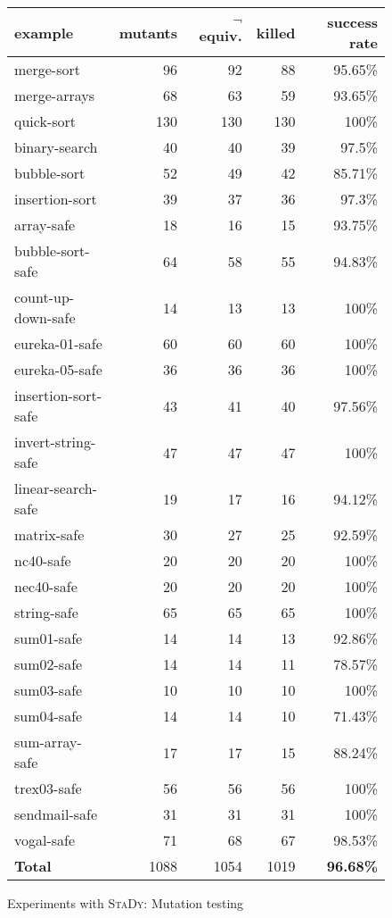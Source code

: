 \begin{figure}[tb]\scriptsize
  \begin{center}
    \begin{tabular}{lrrrr}
      \hline
      example & mutants & $\lnot$ equiv. & killed & success rate \\ \hline
      merge-sort & 96  & 92 & 88 & 95.65\% \\ \hline
      merge-arrays & 68 & 63 & 59 & 93.65\% \\ \hline
      quick-sort & 130 & 130 & 130 & 100\% \\ \hline
      binary-search & 40 & 40 & 39 & 97.5\% \\ \hline
      bubble-sort & 52 & 49 & 42 & 85.71\% \\ \hline
      insertion-sort & 39 & 37 & 36 & 97.3\% \\ \hline
      array-safe & 18 & 16 & 15 & 93.75\% \\ \hline
      bubble-sort-safe & 64 & 58 & 55 & 94.83\% \\ \hline
      count-up-down-safe & 14 & 13 & 13 & 100\% \\ \hline
      eureka-01-safe & 60 & 60 & 60 & 100\% \\ \hline
      eureka-05-safe & 36 & 36 & 36 & 100\% \\ \hline
      insertion-sort-safe & 43 & 41 & 40 & 97.56\% \\ \hline
      invert-string-safe & 47 & 47 & 47 & 100\% \\ \hline
      linear-search-safe & 19 & 17 & 16 & 94.12\% \\ \hline
      matrix-safe & 30 & 27 & 25 & 92.59\% \\ \hline
      nc40-safe & 20 & 20 & 20 & 100\% \\ \hline
      nec40-safe & 20 & 20 & 20 & 100\% \\ \hline
      string-safe & 65 & 65 & 65 & 100\% \\ \hline
      sum01-safe & 14 & 14 & 13 & 92.86\% \\ \hline
      sum02-safe & 14 & 14 & 11 & 78.57\% \\ \hline
      sum03-safe & 10 & 10 & 10 & 100\% \\ \hline
      sum04-safe & 14 & 14 & 10 & 71.43\% \\ \hline
      sum-array-safe & 17 & 17 & 15 & 88.24\% \\ \hline
      trex03-safe & 56 & 56 & 56 & 100\% \\ \hline
      sendmail-safe & 31 & 31 & 31 & 100\% \\ \hline
      vogal-safe & 71 & 68 & 67 & 98.53\% \\ \hline
      \textbf{Total} & 1088 & 1054 & 1019 & \textbf{96.68\%} \\ \hline
    \end{tabular}
  \end{center}
  \vspace{-3mm}
  \caption{Experiments with \textsc{StaDy}: Mutation testing}
  \label{fig:scam-experiments2}
  \vspace{-3mm}
\end{figure}

